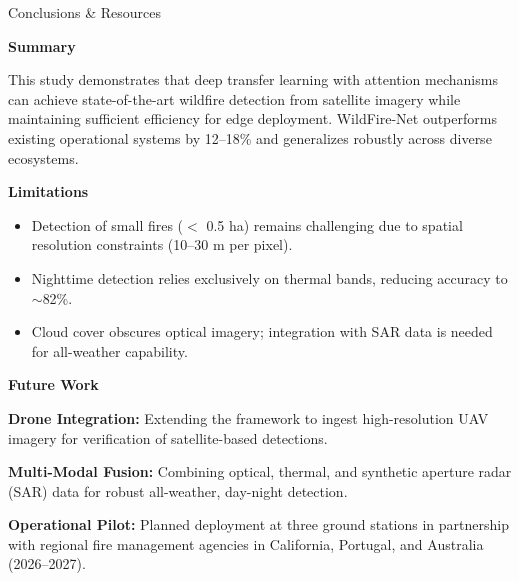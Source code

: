 \documentclass[10pt]{article}
\newlength{\panelwidth}
\newcommand{\paneltitle}[1]{%
  \begin{panelhead}%
    #1%
  \end{panelhead}%
}
\newcommand{\subheading}[1]{%
  \medskip
  {\color{secondary}\bfseries\small #1}
  \smallskip
}
\newcommand{\smallsep}{\vspace{6pt}}
\begin{document}
\hfill
\begin{minipage}[t]{\panelwidth}
  \RaggedRight

  \paneltitle{\faLightbulb\hspace{4pt}Conclusions \& Resources}

  \smallsep

  \subheading{Summary}

  {\footnotesize\color{darktext}
  This study demonstrates that deep transfer learning with
  attention mechanisms can achieve state-of-the-art wildfire
  detection from satellite imagery while maintaining
  sufficient efficiency for edge deployment. WildFire-Net
  outperforms existing operational systems by 12--18\% and
  generalizes robustly across diverse ecosystems.}

  \smallsep

  \subheading{Limitations}

  {\footnotesize\color{darktext}
  \begin{itemize}
    \item Detection of small fires ($<$ 0.5 ha) remains
      challenging due to spatial resolution constraints
      (10--30 m per pixel).
    \item Nighttime detection relies exclusively on thermal
      bands, reducing accuracy to $\sim$82\%.
    \item Cloud cover obscures optical imagery; integration
      with SAR data is needed for all-weather capability.
  \end{itemize}
  }

  \smallsep

  \subheading{Future Work}

  \begin{accentstrip}
    {\footnotesize\color{darktext}\textbf{Drone Integration:}
    Extending the framework to ingest high-resolution UAV
    imagery for verification of satellite-based detections.}
  \end{accentstrip}

  \begin{accentstrip}
    {\footnotesize\color{darktext}\textbf{Multi-Modal Fusion:}
    Combining optical, thermal, and synthetic aperture radar
    (SAR) data for robust all-weather, day-night detection.}
  \end{accentstrip}

  \begin{accentstrip}
    {\footnotesize\color{darktext}\textbf{Operational Pilot:}
    Planned deployment at three ground stations in partnership
    with regional fire management agencies in California,
    Portugal, and Australia (2026--2027).}
  \end{accentstrip}


\end{minipage}
\end{document}
